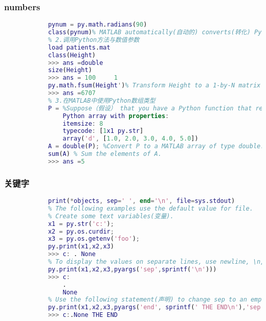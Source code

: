         \subsubsection{numbers}
            \par
            \begin{lstlisting}[language = Matlab]
            % 1.在MATLAB使用Python数值类型
            pynum = py.math.radians(90)
            class(pynum)% MATLAB automatically(自动的) converts(转化) Python float type to double.
            % 2.调用Python方法与数值参数
            load patients.mat
            class(Height)
            >>> ans =double
            size(Height)
            >>> ans = 100     1
            py.math.fsum(Height')% Transform Height to a 1-by-N matrix before calling fsum.
            >>> ans =6707
            % 3.在MATLAB中使用Python数组类型
            P = %Suppose（假设） that you have a Python function that returns the following array, P
                Python array with properties:
                itemsize: 8
                typecode: [1x1 py.str]
                array('d', [1.0, 2.0, 3.0, 4.0, 5.0])
            A = double(P); %Convert P to a MATLAB array of type double.
            sum(A) % Sum the elements of A.
            >>> ans =5
            \end{lstlisting}
        \subsubsection{关键字}
            \par
            \begin{lstlisting}[language = Matlab]
            %% The Python built-in print function has keyword arguments, sep, end, and file.
            print(*objects, sep=' ', end='\n', file=sys.stdout)
            % The following examples use the default value for file.
            % Create some text variables(变量).
            x1 = py.str('c:');
            x2 = py.os.curdir;
            x3 = py.os.getenv('foo');
            py.print(x1,x2,x3)
            >>> c: . None
            % To display the values on separate lines, use newline, \n, as a separator(分离器).
            py.print(x1,x2,x3,pyargs('sep',sprintf('\n')))
            >>> c:
                .
                None
            % Use the following statement(声明) to change sep to an empty string and change the end value to display THE END.
            py.print(x1,x2,x3,pyargs('end', sprintf(' THE END\n'),'sep',py.str))
            >>> c:.None THE END
            \end{lstlisting}

